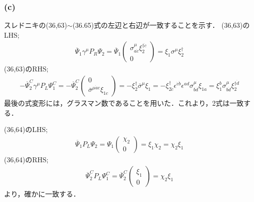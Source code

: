 \subsubsection{(c)}
スレドニキの(36,63)$\sim$(36.65)式の左辺と右辺が一致することを示す．
(36,63)のLHS;
\begin{eqnarray}
\overline{\Psi}_{1}\gamma^{\mu}P_{R}\Psi_{2}=\overline{\Psi}_{1}\left(\begin{array}{c}\sigma^{\mu}_{a\dot{c}}\xi^{\dagger \dot{c}}_2 \\0\end{array}\right)=\xi_1\sigma^{\mu}\xi^{\dagger}_2
\end{eqnarray}
(36,63)のRHS;
\begin{eqnarray}
-\overline{\Psi}_{2}^{C}\gamma^{\mu}P_{L}\Psi_{1}^C=-\overline{\Psi}_{2}^{C}\left(\begin{array}{c}0 \\ \overline{\sigma}^{\mu\dot{a}c}\xi_{1c}\end{array}\right)=-\xi^{\dagger}_2\overline{\sigma}^{\mu}\xi_1=-\xi^{\dagger}_{2\dot{c}} \epsilon^{\dot{c}\dot{b}} \epsilon^{ad} \sigma^{\mu}_{b\dot{d}}\xi_{1a}= \xi_{1}^{b} \sigma^{\mu}_{b\dot{d}} \xi^{\dagger \dot{d}}_{2}
\end{eqnarray}
最後の式変形には，グラスマン数であることを用いた．これより，2式は一致する．


(36,64)のLHS;
\begin{eqnarray}
\overline{\Psi}_{1}P_L\Psi_{2}=\Psi_{1}\left(\begin{array}{c}\chi_2 \\0\end{array}\right)=\xi_1\chi_2=\chi_2\xi_1
\end{eqnarray}
(36,64)のRHS;
\begin{eqnarray}
\overline{\Psi}_{2}^{C}P_L\Psi_{1}^{C}=\overline{\Psi}_{2}^{C}\left(\begin{array}{c}\xi_1 \\0\end{array}\right)=\chi_2\xi_1
\end{eqnarray}より，確かに一致する．

